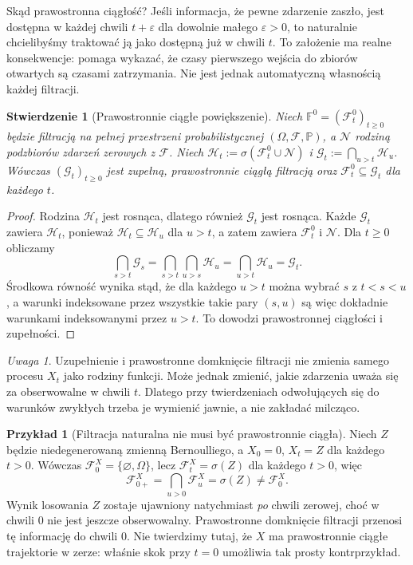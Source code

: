 \documentclass[11pt,a4paper,oneside]{report}
\numberwithin{equation}{chapter}
\theoremstyle{plain}
\newtheorem{stwierdzenie}[twierdzenie]{Stwierdzenie}
\theoremstyle{definition}
\newtheorem{przyklad}{Przykład}[chapter]
\theoremstyle{remark}
\newtheorem{uwaga}{Uwaga}[chapter]
\newcommand{\Prob}{\mathbb{P}}
\newcommand{\calF}{\mathcal{F}}
\newcommand{\calH}{\mathcal{H}}
\newcommand{\calN}{\mathcal{N}}
\newcommand{\calG}{\mathcal{G}}
\begin{document}
Skąd prawostronna ciągłość? Jeśli informacja, że pewne
zdarzenie zaszło, jest dostępna w każdej chwili
$t+\varepsilon$ dla dowolnie małego $\varepsilon>0$,
to naturalnie chcielibyśmy traktować ją jako dostępną
już w chwili $t$. To założenie ma realne konsekwencje:
pomaga wykazać, że czasy pierwszego wejścia do
zbiorów otwartych są czasami zatrzymania.
Nie jest jednak automatyczną własnością każdej filtracji.

\begin{stwierdzenie}[Prawostronnie ciągłe powiększenie]
Niech $\mathbb F^0=(\calF_t^0)_{t\ge0}$ będzie
filtracją na pełnej przestrzeni probabilistycznej
$(\Omega,\calF,\Prob)$, a $\calN$ rodziną podzbiorów
zdarzeń zerowych z $\calF$. Niech
$\calH_t:=\sigma(\calF_t^0\cup\calN)$ i
$\calG_t:=\bigcap_{u>t}\calH_u$.
Wówczas $(\calG_t)_{t\ge0}$ jest zupełną,
prawostronnie ciągłą filtracją oraz
$\calF_t^0\subseteq\calG_t$ dla każdego $t$.
\end{stwierdzenie}
\begin{proof}
Rodzina $\calH_t$ jest rosnąca, dlatego również
$\calG_t$ jest rosnąca. Każde $\calG_t$ zawiera
$\calH_t$, ponieważ $\calH_t\subseteq\calH_u$
dla $u>t$, a zatem zawiera $\calF_t^0$ i $\calN$.
Dla $t\ge0$ obliczamy
\[
\bigcap_{s>t}\calG_s
=\bigcap_{s>t}\bigcap_{u>s}\calH_u
=\bigcap_{u>t}\calH_u=\calG_t.
\]
Środkowa równość wynika stąd, że dla każdego $u>t$
można wybrać $s$ z $t<s<u$, a warunki indeksowane
przez wszystkie takie pary $(s,u)$ są więc dokładnie
warunkami indeksowanymi przez $u>t$.
To dowodzi prawostronnej ciągłości i zupełności.
\end{proof}

\begin{uwaga}
Uzupełnienie i prawostronne domknięcie filtracji
nie zmienia samego procesu $X_t$ jako rodziny funkcji.
Może jednak zmienić, jakie zdarzenia uważa się za
obserwowalne w chwili $t$. Dlatego przy twierdzeniach
odwołujących się do warunków zwykłych trzeba je
wymienić jawnie, a nie zakładać milcząco.
\end{uwaga}


\begin{przyklad}[Filtracja naturalna nie musi być prawostronnie ciągła]
Niech $Z$ będzie niedegenerowaną zmienną Bernoulliego,
a $X_0=0$, $X_t=Z$ dla każdego $t>0$.
Wówczas $\calF_0^X=\{\varnothing,\Omega\}$, lecz
$\calF_t^X=\sigma(Z)$ dla każdego $t>0$, więc
\[
\calF_{0+}^X=\bigcap_{u>0}\calF_u^X
=\sigma(Z)\ne\calF_0^X.
\]
Wynik losowania $Z$ zostaje ujawniony natychmiast
\emph{po} chwili zerowej, choć w chwili $0$ nie jest
jeszcze obserwowalny. Prawostronne domknięcie filtracji
przenosi tę informację do chwili $0$.
Nie twierdzimy tutaj, że $X$ ma prawostronnie ciągłe
trajektorie w zerze: właśnie skok przy $t=0$ umożliwia
tak prosty kontrprzykład.
\end{przyklad}
\end{document}
